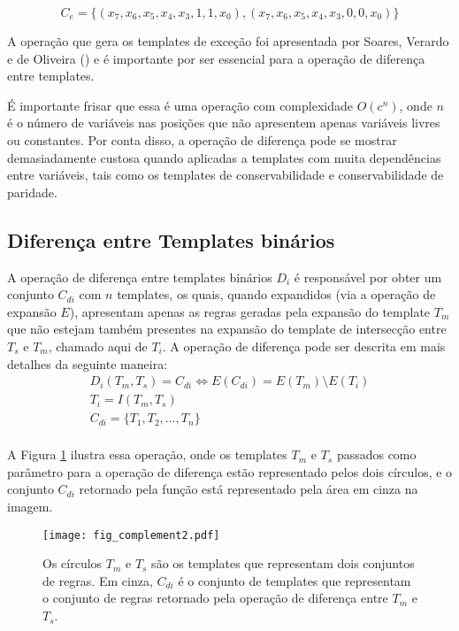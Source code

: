 \begin{equation}
C_e = \{(x_7, x_6, x_5, x_4, x_3, 1, 1, x_0),(x_7, x_6, x_5, x_4, x_3, 0, 0, x_0)\}
\label{eq:exceptionsTemplates2}
\end{equation}

A operação que gera os templates de exceção foi apresentada por Soares, Verardo e
de Oliveira (\citeyear{soares2016difference}) e é importante por ser essencial para a operação de diferença entre templates. 

É importante frisar que essa é uma operação com complexidade $O(c^n)$, onde $n$ é o número de variáveis nas posições que não apresentem apenas variáveis livres ou constantes. Por conta disso, a operação de diferença pode se mostrar demasiadamente custosa quando aplicadas a templates com muita dependências entre variáveis, tais como os templates de conservabilidade e conservabilidade de paridade.

\subsection{Diferença entre Templates binários}
A operação de diferença entre templates binários $D_i$ é responsável por obter um conjunto $C_{di}$ com $n$ templates, os quais, quando expandidos (via a operação de expansão $E$), apresentam apenas as regras geradas pela expansão do template $T_m$ que não estejam também presentes na expansão do template de intersecção entre $T_s$ e $T_m$, chamado aqui de $T_i$. A operação de diferença pode ser descrita em mais detalhes da seguinte maneira:
\begin{equation}
\begin{split}
D_i(T_m,T_s)= C_{di} \Leftrightarrow E(C_{di}) = E(T_m) \setminus E(T_i) \\
T_i = I(T_m,T_s)\\
C_{di} = \{T_1,T_2,\dots, T_n\}\\
\end{split}
\end{equation}

A Figura \ref{fig:complement} ilustra essa operação, onde os templates $T_m$ e $T_s$ passados como parâmetro para a operação de diferença estão representado pelos dois círculos, e o conjunto $C_{di}$ retornado pela função está representado pela área em cinza na imagem.
\begin{figure}[h!]
  \centering
  \texttt{[image: fig\_complement2.pdf]}
  \caption{Os círculos $T_m$ e $T_s$ são os templates que representam dois conjuntos de regras. Em cinza, $C_{di}$ é o conjunto de templates que representam o conjunto de regras retornado pela operação de diferença entre $T_m$ e $T_s$.}
  \label{fig:complement}
\end{figure}    

